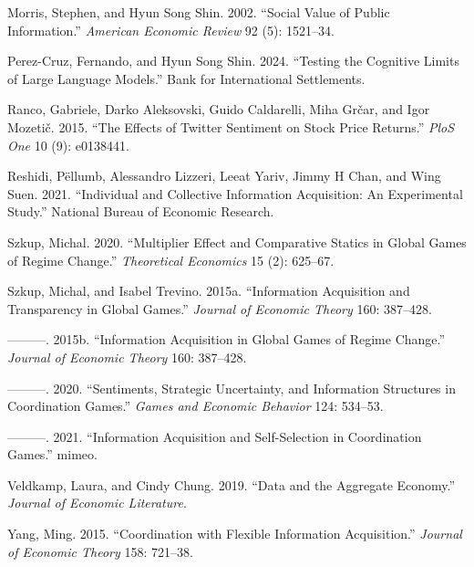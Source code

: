 \documentclass[
]{article}
\newlength{\cslhangindent}
\newlength{\cslentryspacingunit} %
\newenvironment{CSLReferences}[2] %
 {%
  \setlength{\parindent}{0pt}
  \ifodd #1
  \let\oldpar\par
  \def\par{\hangindent=\cslhangindent\oldpar}
  \fi
  \setlength{\parskip}{#2\cslentryspacingunit}
 }%
 {}
\theoremstyle{plain}
\theoremstyle{remark}
\begin{document}
\begin{CSLReferences}{1}{0}
\leavevmode{}%
Morris, Stephen, and Hyun Song Shin. 2002. {``Social Value of Public
Information.''} \emph{American Economic Review} 92 (5): 1521--34.

\leavevmode{}%
Perez-Cruz, Fernando, and Hyun Song Shin. 2024. {``Testing the Cognitive
Limits of Large Language Models.''} Bank for International Settlements.

\leavevmode{}%
Ranco, Gabriele, Darko Aleksovski, Guido Caldarelli, Miha Grčar, and
Igor Mozetič. 2015. {``The Effects of Twitter Sentiment on Stock Price
Returns.''} \emph{PloS One} 10 (9): e0138441.

\leavevmode{}%
Reshidi, Pëllumb, Alessandro Lizzeri, Leeat Yariv, Jimmy H Chan, and
Wing Suen. 2021. {``Individual and Collective Information Acquisition:
An Experimental Study.''} National Bureau of Economic Research.

\leavevmode{}%
Szkup, Michal. 2020. {``Multiplier Effect and Comparative Statics in
Global Games of Regime Change.''} \emph{Theoretical Economics} 15 (2):
625--67.

\leavevmode{}%
Szkup, Michal, and Isabel Trevino. 2015a. {``Information Acquisition and
Transparency in Global Games.''} \emph{Journal of Economic Theory} 160:
387--428.

\leavevmode{}%
---------. 2015b. {``Information Acquisition in Global Games of Regime
Change.''} \emph{Journal of Economic Theory} 160: 387--428.

\leavevmode{}%
---------. 2020. {``Sentiments, Strategic Uncertainty, and Information
Structures in Coordination Games.''} \emph{Games and Economic Behavior}
124: 534--53.

\leavevmode{}%
---------. 2021. {``Information Acquisition and Self-Selection in
Coordination Games.''} mimeo.

\leavevmode{}%
Veldkamp, Laura, and Cindy Chung. 2019. {``Data and the Aggregate
Economy.''} \emph{Journal of Economic Literature}.

\leavevmode{}%
Yang, Ming. 2015. {``Coordination with Flexible Information
Acquisition.''} \emph{Journal of Economic Theory} 158: 721--38.

\end{CSLReferences}
\end{document}
